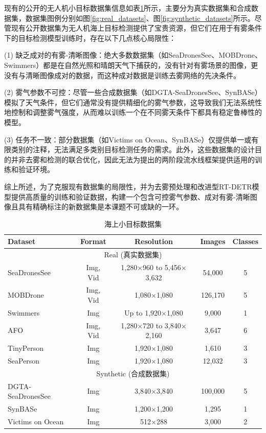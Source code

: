 现有的公开的无人机小目标数据集信息如表\ref{tab:maritime_datasets}所示，主要分为真实数据集和合成数据集，数据集图例分别如图\ref{fig:real_datasets}、图\ref{fig:synthetic_datasets}所示。尽管现有公开数据集为无人机海上目标检测提供了宝贵资源，但它们在用于有雾条件下的目标检测模型训练时，存在以下几点核心局限性：

(1) 缺乏成对的有雾-清晰图像：绝大多数数据集（如SeaDronesSee、MOBDrone、Swimmers）都是在自然光照和晴朗天气下捕获的，没有针对有雾场景的图像，更没有与清晰图像成对的数据，而这种成对数据是训练去雾网络的先决条件。

(2) 雾气参数不可控：尽管一些合成数据集（如DGTA-SeaDronesSee、SynBASe）模拟了天气条件，但它们通常没有提供精细化的雾气参数，这导致我们无法系统性地控制和调整雾气强度，从而难以训练一个在不同雾天条件下都具有稳定鲁棒性的模型。

(3) 任务不一致：部分数据集（如Victims on Ocean、SynBASe）仅提供单一或有限类别的注释，无法满足多类别目标检测任务的需求。此外，这些数据集的设计目的并非去雾和检测的联合优化，因此无法为提出的两阶段流水线框架提供适用的训练和验证环境。

综上所述，为了克服现有数据集的局限性，并为去雾预处理和改进型RT-DETR模型提供高质量的训练和验证数据，构建一个包含可控雾气参数、成对有雾-清晰图像且具有精确标注的新数据集是本课题不可或缺的一环。

\begin{table}[!htbp]
\centering
\caption{海上小目标数据集}
\label{tab:maritime_datasets}
\begin{tabular}{lcccc}
\toprule
Dataset & Format  & Resolution & Images & Classes \\
\midrule
\multicolumn{5}{c}{Real (真实数据集)} \\
\midrule
SeaDronesSee & Img, Vid   & 1,280$\times$960 to 5,456$\times$3,632 & 54,000 & 5 \\
MOBDrone & Img, Vid   & 1,080$\times$1,080 & 126,170 & 5 \\
Swimmers & Img   & Up to 1,920$\times$1,080 & 9,000 & 1 \\
AFO & Img, Vid   & 1,280$\times$720 to 3,840$\times$2,160 & 3,647 & 6 \\
TinyPerson & Img   & 1,920$\times$1,080 & 1,610 & 3 \\
SeaPerson & Img   & 1,920$\times$1,080 & 12,032 & 3 \\
\midrule
\multicolumn{5}{c}{Synthetic (合成数据集)} \\
\midrule
DGTA-SeaDronesSee & Img  & 3,840$\times$3,840 & 100,000 & 5 \\
SynBASe & Img   & 1,200$\times$1,200 & 1,295 & 1 \\
Victims on Ocean & Img  & 512$\times$288 & 3,000 & 2 \\
\bottomrule
\end{tabular}
\end{table}

